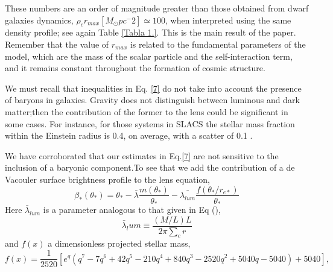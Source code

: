 \documentclass[15pt]{IEEEtran}
\begin{document}
These  numbers  are  an  order  of  magnitude  greater than   those   obtained  from   dwarf   galaxies   dynamics, \(\rho_c r_{max}[M_\odot pc^-2] \simeq 100\), when interpreted using the same density profile; see again Table \eqref{Tabla 1.}. This is the main result of the paper.  Remember that the value of \(r_{max}\) is related to the fundamental parameters of the model, which are the mass of the scalar particle and the self-interaction term, and it remains constant throughout the formation of cosmic structure.
\par
We must recall that inequalities in Eq. \eqref{7} do not take into account the presence of baryons in galaxies.  Gravity does not distinguish between luminous and dark matter;then the contribution of the former to the lens could be significant in some cases.  For instance, for those systems in SLACS the stellar mass fraction within the Einstein radius is 0.4, on average, with a scatter of 0.1 .
\par
We have corroborated that our estimates in Eq.\eqref{7} are not sensitive to the inclusion of a baryonic component.To  see  that  we  add  the  contribution  of  a  de  Vacouler surface brightness profile to the lens equation,
\begin{equation}\tag{8a}\label{8}
    \beta_*(\theta_*) = \theta_* - \bar{\lambda}\frac{m(\theta_*)}{\theta_*} -\bar{\lambda_{lum}}\frac{f(\theta_*/r_{e*})}{\theta_*}
\end{equation}
Here \(\bar{\lambda}_{lum}\) is  a  parameter  analogous  to  that  given  in Eq (),
\begin{equation}\tag{8b}
    \bar{\lambda}_lum \equiv \frac{(M/L)L}{2\pi\sum_cr}
\end{equation}
and \(f(x)\) a dimensionless projected stellar mass,
\begin{equation}\tag{8c}
    f(x) = \frac{1}{2520}[e^q(q^7- 7q^6 +42q^5- 210q^4 + 840q^3 - 2520q^2 +
    
    5040q -5040) + 5040],
\end{equation}
\end{document}
